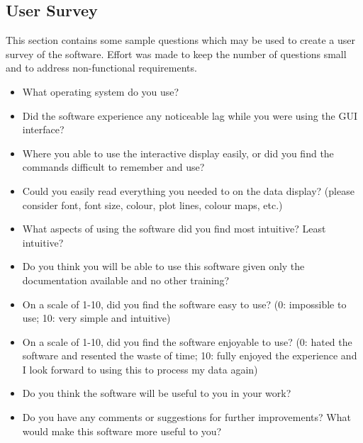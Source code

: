 \documentclass[12pt, titlepage]{article}
\begin{document}
\subsection{User Survey}
This section contains some sample questions which may be used to create a user
survey of the software. Effort was made to keep the number of questions small
and to address non-functional requirements.
\begin{itemize}
\item What operating system do you use?
\item Did the software experience any noticeable lag while you were using the
GUI interface?
\item Where you able to use the interactive display easily, or did you find the
commands difficult to remember and use?
\item Could you easily read everything you needed to on the data display?
(please consider font, font size, colour, plot lines, colour maps, etc.)
\item What aspects of using the software did you find most intuitive? Least
intuitive?
\item Do you think you will be able to use this software given only the
documentation available and no other training?
\item On a scale of 1-10, did you find the software easy to use? (0: impossible
to use; 10: very simple and intuitive)
\item On a scale of 1-10, did you find the software enjoyable to use? (0: hated
the software and resented the waste of time; 10: fully enjoyed the experience
and I look forward to using this to process my data again)
\item Do you think the software will be useful to you in your work?
\item Do you have any comments or suggestions for further improvements? What
would make this software more useful to you?
\end{itemize}
\end{document}
